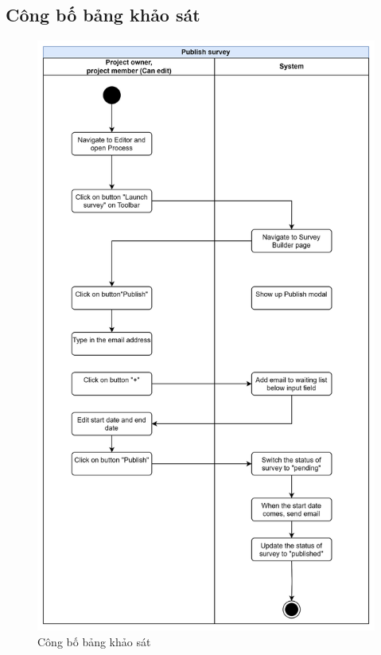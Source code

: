 \subsection{Công bố bảng khảo sát}
\begin{figure}[H]
    \centering
    \includegraphics[width=0.8\linewidth]{Content/Phân tích và thiết kế hệ thống/documents/Sơ đồ hoạt động/images/publishSurvey.png}
    \vspace{0.5cm}
    \caption{Công bố bảng khảo sát}
    \label{fig:Công bố bảng khảo sát}
\end{figure}